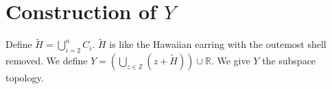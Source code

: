 \documentclass[twocolumn]{article}
\begin{document}
\section{Construction of $Y$}
Define {$\tilde H=\bigcup_{i=2}^n C_i$}. $\tilde H$ is like the Hawaiian earring with the outemost shell removed. We define {$Y=\left(\bigcup_{z\in\mathbb Z}(z+\tilde H)\right)\cup\mathbb R$}. We give $Y$ the subspace topology.
\begin{figure}[H]
	\begin{center}
		
		\begin{tikzpicture}[x=0.5pt,y=0.5pt,yscale=-1,xscale=1]
		

\end{tikzpicture}
\end{center}
\end{figure}
\end{document}
